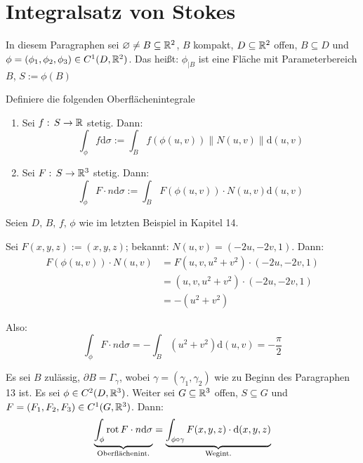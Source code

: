\documentclass[a4paper,twoside,DIV15,BCOR12mm,chapterprefix=true,headings=onelinechapter]{scrbook}
\begin{document}
\chapter{Integralsatz von Stokes}

In diesem Paragraphen sei \(\varnothing\neq B\subseteq\mathbb{R}^{2}\), \(B\) kompakt, \(D\subseteq\mathbb{R}^{2}\) offen, \(B\subseteq D\)
und \(\phi=(\phi_{1},\phi_{2},\phi_{3})\in C^{1}(D,\mathbb{R}^{2})\). Das hei\ss t: \(\phi_{|B}\) ist eine Fl\"ache mit 
Parameterbereich \(B\), \(S:=\phi(B)\)

\begin{definition}
Definiere die folgenden Oberfl\"achenintegrale
\begin{enumerate}
\item Sei \(f:\,S\to\mathbb{R}\) stetig. Dann: 
\[
\int_{\phi}{f\mathrm{d}\sigma}:=\int_{B}{f(\phi(u,v))\lVert N(u,v)\rVert\mathrm{d}(u,v)}
\]
\item Sei \(F:\,S\to\mathbb{R}^{3}\) stetig. Dann:
\[
\int_{\phi}{F\cdot n\mathrm{d}\sigma}:=\int_{B}{F(\phi(u,v))\cdot N(u,v)\mathrm{d}(u,v)}
\]
\end{enumerate}
\end{definition}

\begin{beispiel}
Seien \(D,\,B,\,f,\,\phi\) wie im letzten Beispiel in Kapitel 14.	%

Sei \(F(x,y,z):=(x,y,z)\); bekannt: \(N(u,v)=(-2u,-2v,1)\). Dann:
\begin{align*}
F(\phi(u,v))\cdot N(u,v)&=F(u,v,u^{2}+v^{2})\cdot(-2u,-2v,1)\\
&=(u,v,u^{2}+v^{2})\cdot (-2u,-2v,1)\\
&=-(u^{2}+v^{2})
\end{align*}

Also: 
\[
\int_{\phi}{F\cdot n\mathrm{d}\sigma}=-\int_{B}{(u^{2}+v^{2})\mathrm{d}(u,v)}=-\frac{\pi}{2}
\]
\end{beispiel}

\begin{satz}
\label{Satz 15.1}
Es sei \(B\) zul\"assig, \(\partial B=\Gamma_{\gamma}\), wobei \(\gamma=(\gamma_{1},\gamma_{2})\) wie zu Beginn des Paragraphen
13 ist. Es sei \(\phi\in C^{2}(D,\mathbb{R}^{3})\). Weiter sei \(G\subseteq\mathbb{R}^{3}\) offen, \(S\subseteq G\) und \(F=(F_{1},F_{2},F_{3})\in C^{1}(G,\mathbb{R}^{3})\). Dann:
\[
\underbrace{\int_{\phi}{\mathop{\rm rot}\nolimits F\cdot n\mathrm{d}\sigma}}_{\text{Oberfl\"achenint.}}=
    \underbrace{\int_{\phi\circ\gamma}{F(x,y,z)\cdot\mathrm{d}(x,y,z)}}_{\text{Wegint.}}
\]
\end{satz}
\end{document}
